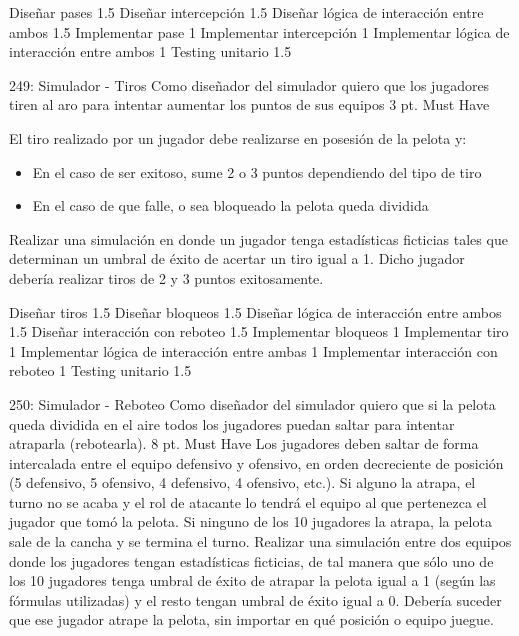 \begin{taskstable}
 \task
 {Diseñar pases}
 {1.5}
 \task
 {Diseñar intercepción}
 {1.5}
 \task
 {Diseñar lógica de interacción entre ambos}
 {1.5}
 \task
 {Implementar pase}
 {1}
 \task
 {Implementar intercepción}
 {1}
 \task
 {Implementar lógica de interacción entre ambos}
 {1}
 \task
 {Testing unitario}
 {1.5}
\end{taskstable}
 
 \vspace{1cm}

\sprintstory
{249: Simulador - Tiros}
{Como diseñador del simulador quiero que los jugadores tiren al aro para intentar aumentar los puntos de sus equipos}
{3 pt.}
{Must Have}
{El tiro realizado por un jugador debe realizarse en posesión de la pelota y:
\begin{itemize}
	\item En el caso de ser exitoso, sume 2 o 3 puntos dependiendo del tipo de tiro
	\item En el caso de que falle, o sea bloqueado la pelota queda dividida
\end{itemize}}
{Realizar una simulación en donde un jugador tenga estadísticas ficticias tales que determinan un umbral de éxito de acertar un tiro igual a 1.
Dicho jugador debería realizar tiros de 2 y 3 puntos exitosamente.}

\begin{taskstable}
 \task
 {Diseñar tiros}
 {1.5}
 \task
 {Diseñar bloqueos}
 {1.5}
 \task
 {Diseñar lógica de interacción entre ambos}
 {1.5}
 \task
 {Diseñar interacción con reboteo}
 {1.5}
 \task
 {Implementar bloqueos}
 {1}
 \task
 {Implementar tiro}
 {1}
 \task
 {Implementar lógica de interacción entre ambas}
 {1}
 \task
 {Implementar interacción con reboteo}
 {1}
 \task
 {Testing unitario}
 {1.5}
\end{taskstable}

\vspace{1cm}


\sprintstory
{250: Simulador - Reboteo}
{Como diseñador del simulador quiero que si la pelota queda dividida en el aire todos los jugadores puedan saltar para intentar atraparla (rebotearla).}
{8 pt.}
{Must Have}
{Los jugadores deben saltar de forma intercalada entre el equipo defensivo y ofensivo, en orden decreciente de posición (5 defensivo, 5 ofensivo, 4 defensivo, 4 ofensivo, etc.). Si alguno la atrapa, el turno no se acaba y el rol de atacante lo tendrá el equipo al que pertenezca el jugador que tomó la pelota. Si ninguno de los 10 jugadores la atrapa, la pelota sale de la cancha y se termina el turno.}
{Realizar una simulación entre dos equipos donde los jugadores tengan estadísticas ficticias, de tal manera que sólo uno de los 10 jugadores tenga umbral de éxito de atrapar la pelota igual a 1 (según las fórmulas utilizadas) y el resto tengan umbral de éxito igual a 0. Debería suceder que ese jugador atrape la pelota, sin importar en qué posición o equipo juegue.}

